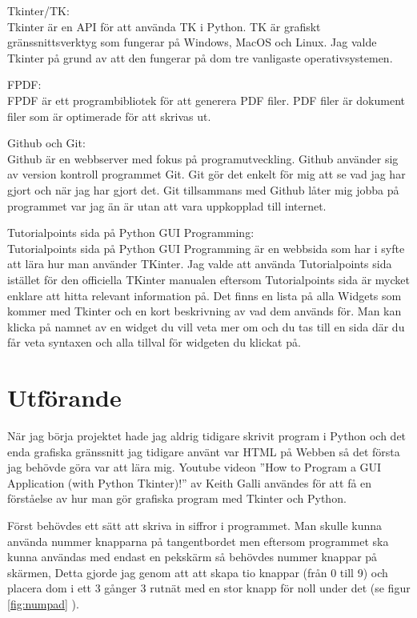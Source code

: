 \documentclass[a4paper, 12pt]{article}
\begin{document}
Tkinter/TK:\\
Tkinter är en API för att använda TK i Python. 
TK är grafiskt gränssnittsverktyg som fungerar på Windows, MacOS och Linux. 
Jag valde Tkinter på grund av att den fungerar på dom tre vanligaste operativsystemen.


FPDF:\\
FPDF är ett programbibliotek för att generera PDF filer.
PDF filer är dokument filer som är optimerade för att skrivas ut.


Github och Git:\\
Github är en webbserver med fokus på programutveckling. 
Github använder sig av version kontroll programmet Git. 
Git gör det enkelt för mig att se vad jag har gjort och när jag har gjort det.
Git tillsammans med Github låter mig jobba på programmet var jag än är utan att vara uppkopplad till internet.


Tutorialpoints sida på Python GUI Programming:\\
Tutorialpoints sida på Python GUI Programming är en webbsida som har i syfte att lära hur man använder TKinter.
Jag valde att använda Tutorialpoints sida istället för den officiella TKinter manualen eftersom Tutorialpoints sida är mycket enklare att hitta relevant information på. Det finns en lista på alla Widgets som kommer med Tkinter och en kort beskrivning av vad dem används för. Man kan klicka på namnet av en widget du vill veta mer om och du tas till en sida där du får veta syntaxen och alla tillval för widgeten du klickat på.

\section{Utförande}

När jag börja projektet hade jag aldrig tidigare skrivit program i Python och det enda grafiska gränssnitt jag tidigare använt var HTML på Webben så det första jag behövde göra var att lära mig.
Youtube videon ''How to Program a GUI Application (with Python Tkinter)!'' av Keith Galli\cite{yt:galli} användes för att få en förståelse av hur man gör grafiska program med Tkinter och Python. 


Först behövdes ett sätt att skriva in siffror i programmet.
Man skulle kunna använda nummer knapparna på tangentbordet men eftersom programmet ska kunna användas med endast en pekskärm så behövdes nummer knappar på skärmen, Detta gjorde jag genom att att skapa tio knappar (från 0 till 9)  och placera dom i ett 3 gånger 3 rutnät med en stor knapp för noll under det (se figur \ref{fig:numpad} ).
\end{document}
